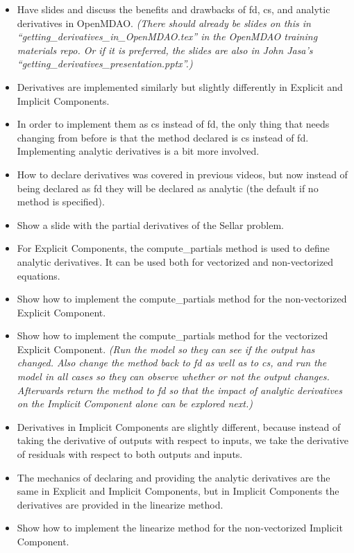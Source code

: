 \documentclass[12pt, letterpaper]{article}
\begin{document}
\begin{itemize}
		\begin{itemize}
			\item Have slides and discuss the benefits and drawbacks of fd, cs, and analytic derivatives in OpenMDAO. \textit{(There should already be slides on this in “getting\_derivatives\_in\_OpenMDAO.tex” in the OpenMDAO training materials repo. Or if it is preferred, the slides are also in John Jasa’s “getting\_derivatives\_presentation.pptx”.)}
			\item Derivatives are implemented similarly but slightly differently in Explicit and Implicit Components. 
			\item In order to implement them as cs instead of fd, the only thing that needs changing from before is that the method declared is cs instead of fd. Implementing analytic derivatives is a bit more involved.
			\item How to declare derivatives was covered in previous videos, but now instead of being declared as fd they will be declared as analytic (the default if no method is specified).
			\item Show a slide with the partial derivatives of the Sellar problem.
			\item For Explicit Components, the compute\_partials method is used to define analytic derivatives. It can be used both for vectorized and non-vectorized equations.
			\item Show how to implement the compute\_partials method for the non-vectorized Explicit Component.
			\item Show how to implement the compute\_partials method for the vectorized Explicit Component.
			\textit{(Run the model so they can see if the output has changed. Also change the method back to fd as well as to cs, and run the model in all cases so they can observe whether or not the output changes. Afterwards return the method to fd so that the impact of analytic derivatives on the Implicit Component alone can be explored next.)}
			\item Derivatives in Implicit Components are slightly different, because instead of taking the derivative of outputs with respect to inputs, we take the derivative of residuals with respect to both outputs and inputs.
			\item The mechanics of declaring and providing the analytic derivatives are the same in Explicit and Implicit Components, but in Implicit Components the derivatives are provided in the linearize method.
			\item Show how to implement the linearize method for the non-vectorized Implicit Component.

\end{itemize}
\end{itemize}
\end{document}

